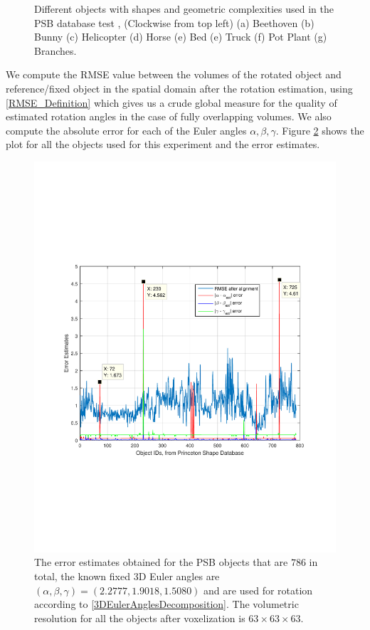 \documentclass{UCF_ETD}
\begin{document}
\begin{figure}[H]
\begin{center}
\caption{Different objects with shapes and geometric complexities used in the PSB database test \cite{Princeton2004}, (Clockwise from top left) (a) Beethoven (b) Bunny (c) Helicopter (d) Horse (e) Bed (e) Truck (f) Pot Plant (g) Branches. }
\label{PDBGeneral3DObjects.fig}
\end{center}
\end{figure}

We compute the RMSE value between the volumes of the rotated object and reference/fixed object in the spatial domain after the rotation estimation, using \eqref{RMSE_Definition} which gives us a crude global measure for the quality of estimated rotation angles in the case of fully overlapping volumes. We also compute the absolute error for each of the Euler angles $\alpha,\beta,\gamma$.  Figure \ref{PDBComplete.fig} shows the plot for all the objects used for this experiment and the error estimates.

\begin{figure}[H] 
\begin{center}
\includegraphics[scale=0.5]{RobustRegistration/NoiselessFullComparisonFinal}
\caption{The error estimates obtained for the PSB objects that are $786$ in total, the known fixed $3$D Euler angles are $(\alpha,\beta,\gamma ) = (2.2777,  1.9018,  1.5080)$  and are used for rotation according to \eqref{3DEulerAnglesDecomposition}. The volumetric resolution for all the objects after voxelization is $63\times 63\times 63$. }
\label{PDBComplete.fig}
\end{center}
\end{figure}
\end{document}
